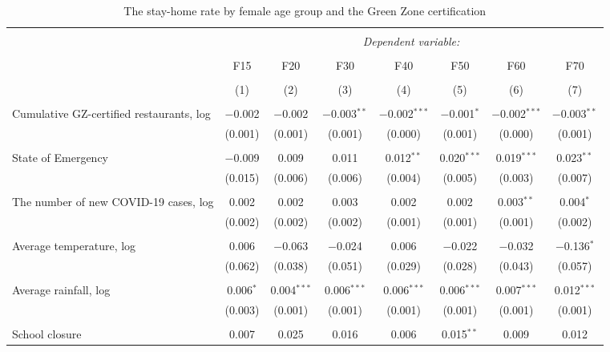 
\begin{table}[H] \centering 
  \caption{The stay-home rate by female age group and the Green Zone certification} 
  \label{} 
\footnotesize 
\begin{tabular}{@{\extracolsep{-11pt}}lccccccc} 
\\[-1.8ex]\hline 
\hline \\[-1.8ex] 
 & \multicolumn{7}{c}{\textit{Dependent variable:}} \\ 
\cline{2-8} 
\\[-1.8ex] & F15 & F20 & F30 & F40 & F50 & F60 & F70 \\ 
\\[-1.8ex] & (1) & (2) & (3) & (4) & (5) & (6) & (7)\\ 
\hline \\[-1.8ex] 
 Cumulative GZ-certified restaurants, log & $-$0.002 & $-$0.002 & $-$0.003$^{**}$ & $-$0.002$^{***}$ & $-$0.001$^{*}$ & $-$0.002$^{***}$ & $-$0.003$^{**}$ \\ 
  & (0.001) & (0.001) & (0.001) & (0.000) & (0.001) & (0.000) & (0.001) \\ 
  & & & & & & & \\ 
 State of Emergency & $-$0.009 & 0.009 & 0.011 & 0.012$^{**}$ & 0.020$^{***}$ & 0.019$^{***}$ & 0.023$^{**}$ \\ 
  & (0.015) & (0.006) & (0.006) & (0.004) & (0.005) & (0.003) & (0.007) \\ 
  & & & & & & & \\ 
 The number of new COVID-19 cases, log & 0.002 & 0.002 & 0.003 & 0.002 & 0.002 & 0.003$^{**}$ & 0.004$^{*}$ \\ 
  & (0.002) & (0.002) & (0.002) & (0.001) & (0.001) & (0.001) & (0.002) \\ 
  & & & & & & & \\ 
 Average temperature, log & 0.006 & $-$0.063 & $-$0.024 & 0.006 & $-$0.022 & $-$0.032 & $-$0.136$^{*}$ \\ 
  & (0.062) & (0.038) & (0.051) & (0.029) & (0.028) & (0.043) & (0.057) \\ 
  & & & & & & & \\ 
 Average rainfall, log & 0.006$^{*}$ & 0.004$^{***}$ & 0.006$^{***}$ & 0.006$^{***}$ & 0.006$^{***}$ & 0.007$^{***}$ & 0.012$^{***}$ \\ 
  & (0.003) & (0.001) & (0.001) & (0.001) & (0.001) & (0.001) & (0.001) \\ 
  & & & & & & & \\ 
 School closure & 0.007 & 0.025 & 0.016 & 0.006 & 0.015$^{**}$ & 0.009 & 0.012 \\ 

\end{tabular}
\end{table}
